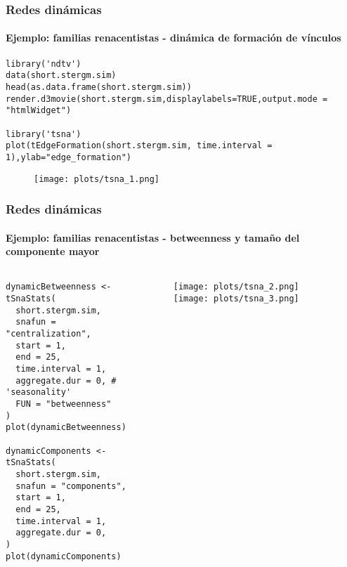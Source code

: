 \documentclass[11pt]{beamer}
\begin{document}
\begin{frame}[fragile]
\frametitle{Redes dinámicas}
\framesubtitle{Ejemplo: familias renacentistas - dinámica de formación de vínculos}
    \begin{verbatim} 
library('ndtv')
data(short.stergm.sim)
head(as.data.frame(short.stergm.sim))
render.d3movie(short.stergm.sim,displaylabels=TRUE,output.mode = "htmlWidget") 

library('tsna')
plot(tEdgeFormation(short.stergm.sim, time.interval = 1),ylab="edge_formation")
    \end{verbatim}
 

\begin{figure}
    \centering
    \texttt{[image: plots/tsna\_1.png]}
    \label{fig:my_label}
\end{figure}    
\end{frame}

\begin{frame}[fragile]
\frametitle{Redes dinámicas}
\framesubtitle{Ejemplo: familias renacentistas - betweenness y tamaño del componente mayor}
\begin{columns}
\begin{column}{0.4\linewidth}
\begin{verbatim} 
dynamicBetweenness <- tSnaStats(
  short.stergm.sim,
  snafun = "centralization",
  start = 1,
  end = 25,
  time.interval = 1,
  aggregate.dur = 0, # 'seasonality'
  FUN = "betweenness"
)
plot(dynamicBetweenness)

dynamicComponents <- tSnaStats(
  short.stergm.sim,
  snafun = "components",
  start = 1,
  end = 25,
  time.interval = 1,
  aggregate.dur = 0, 
)
plot(dynamicComponents)
    \end{verbatim}
    \end{column}
 
\begin{column}{0.4\linewidth}
    \begin{figure}
    \centering
\texttt{[image: plots/tsna\_2.png]}
\texttt{[image: plots/tsna\_3.png]}

    \label{fig:my_label}
\end{figure}    
\end{column}
\end{columns}

\end{frame}
\end{document}
